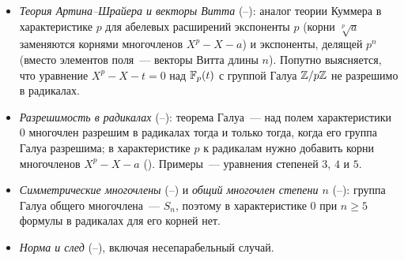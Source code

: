 \begin{itemize}[leftmargin=*]
\item \emph{Теория Артина--Шрайера и векторы Витта} (--): аналог теории Куммера в характеристике $p$ для
абелевых расширений экспоненты $p$ (корни $\sqrt[p]{a}$ заменяются корнями многочленов $X^p-X-a$) и экспоненты, делящей
$p^n$ (вместо элементов поля~--- векторы Витта длины $n$). Попутно выясняется, что уравнение $X^p-X-t=0$ над $\mathbb F_p(t)$ с
группой Галуа $\mathbb Z/p\mathbb Z$ не разрешимо в радикалах.
\item \emph{Разрешимость в радикалах} (--): теорема Галуа~--- над полем характеристики $0$ многочлен разрешим в
радикалах тогда и только тогда, когда его группа Галуа разрешима; в характеристике $p$ к радикалам нужно добавить корни
многочленов $X^p-X-a$ (). Примеры~--- уравнения степеней $3$, $4$ и $5$.
\item \emph{Симметрические многочлены} (--) и \emph{общий многочлен степени $n$} (--): группа Галуа общего
многочлена~--- $S_n$, поэтому в характеристике $0$ при $n\ge5$ формулы в радикалах для его корней нет.
\item \emph{Норма и след} (--), включая несепарабельный случай.
\end{itemize}
